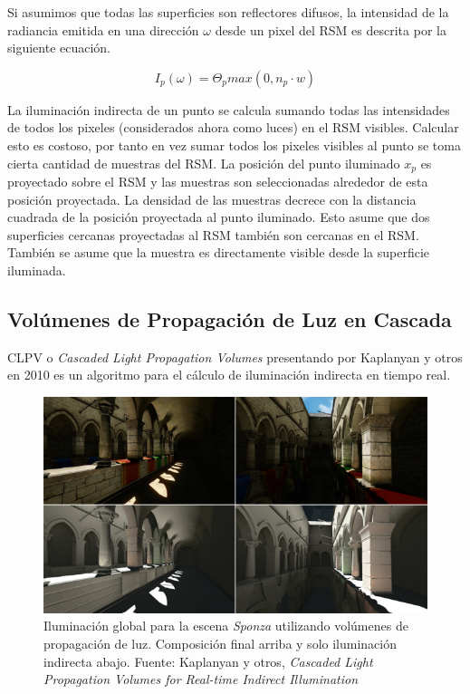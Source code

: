 Si asumimos que todas las superficies son reflectores difusos, la intensidad de la radiancia emitida en una dirección $\omega$ desde un pixel del \ac{RSM} es descrita por la siguiente ecuación.

\begin{equation}
    I_{p}(\omega) = \Theta_{p}max(0, n_{p} \cdot {w})
    \label{eq:rsm_radiance}
\end{equation}

La iluminación indirecta de un punto se calcula sumando todas las intensidades de todos los pixeles (considerados ahora como luces) en el \ac{RSM} visibles. Calcular esto es costoso, por tanto en vez sumar todos los pixeles visibles al punto se toma cierta cantidad de muestras del \ac{RSM}. La posición del punto iluminado $x_{p}$ es proyectado sobre el \ac{RSM} y las muestras son seleccionadas alrededor de esta posición proyectada. La densidad de las muestras decrece con la distancia cuadrada de la posición proyectada al punto iluminado. Esto asume que dos superficies cercanas proyectadas al \ac{RSM} también son cercanas en el \ac{RSM}. También se asume que la muestra es directamente visible desde la superficie iluminada.

\subsection{Volúmenes de Propagación de Luz en Cascada}
\Ac{CLPV} o \emph{Cascaded Light Propagation Volumes} presentando por Kaplanyan y otros en 2010 \cite{Kaplanyan:2010} es un algoritmo para el cálculo de iluminación indirecta en tiempo real.

\begin{figure}[H]
	\centering
	\includegraphics[width=0.85\linewidth]{media/lpvresult.png}
	\caption{Iluminación global para la escena \emph{Sponza} utilizando volúmenes de propagación de luz. Composición final arriba y solo iluminación indirecta abajo. Fuente: Kaplanyan y otros, \emph{Cascaded Light Propagation Volumes for Real-time Indirect Illumination} \cite{Kaplanyan:2010}}
	\label{fig:lvp_results}
\end{figure}

